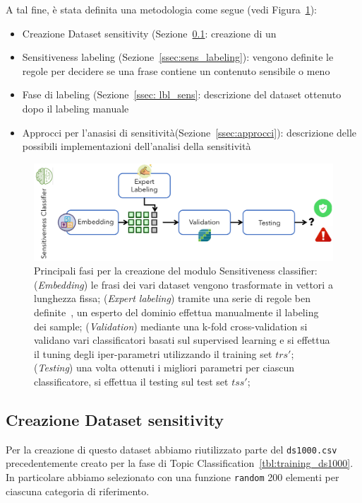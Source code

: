 A tal fine, è stata definita una metodologia come segue (vedi Figura~\ref{fig:methodsens}):
\begin{itemize}
    \item Creazione Dataset sensitivity (Sezione~\ref{ssec:create_sens_ds}: creazione di un 
    \item Sensitiveness labeling (Sezione~\ref{ssec:sens_labeling}): vengono definite le regole per decidere se una frase contiene un contenuto sensibile o meno
    \item Fase di labeling (Sezione~\ref{ssec: lbl_sens}: descrizione del dataset ottenuto dopo il labeling manuale
    \item Approcci per l'anasisi di sensitività(Sezione~\ref{ssec:approcci}): descrizione delle possibili implementazioni dell'analisi della sensitività
\end{itemize}

\begin{figure}[h!t]
    \centering
    \includegraphics[width=15cm]{Figure/grafici/sensitivenessmethod_cropped.pdf}
    \caption{Principali fasi per la creazione del modulo Sensitiveness classifier: (\textit{Embedding}) le frasi dei vari dataset vengono trasformate in vettori a lunghezza fissa; (\textit{Expert labeling}) tramite una serie di regole ben definite~\cite{}, un esperto del dominio effettua manualmente il labeling dei sample; (\textit{Validation}) mediante una k-fold cross-validation si validano vari classificatori basati sul supervised learning e si effettua il tuning degli iper-parametri utilizzando il training set $trs'$; (\textit{Testing}) una volta ottenuti i migliori parametri per ciascun classificatore, si effettua il testing sul test set $tss'$;   }
    \label{fig:methodsens}
\end{figure}

\subsection{Creazione Dataset sensitivity}
\label{ssec:create_sens_ds}
Per la creazione di questo dataset abbiamo riutilizzato parte del {\tt ds1000.csv} precedentemente creato per la fase di Topic Classification~\ref{tbl:training_ds1000}. In particolare abbiamo selezionato con una funzione {\tt random} 200 elementi per ciascuna categoria di riferimento.

